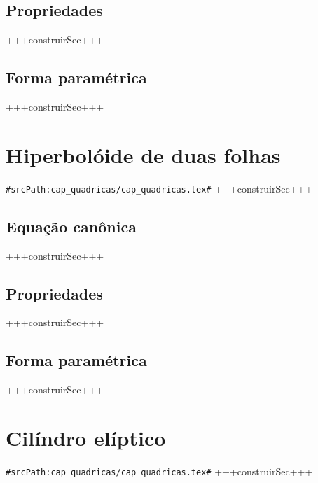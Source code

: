 \subsection{Propriedades}
+++construirSec+++

\subsection{Forma paramétrica}
+++construirSec+++

\section{Hiperbolóide de duas folhas}
\verb+#srcPath:cap_quadricas/cap_quadricas.tex#+
+++construirSec+++

\subsection{Equação canônica}
+++construirSec+++

\subsection{Propriedades}
+++construirSec+++

\subsection{Forma paramétrica}
+++construirSec+++






\section{Cilíndro elíptico}
\verb+#srcPath:cap_quadricas/cap_quadricas.tex#+
+++construirSec+++

